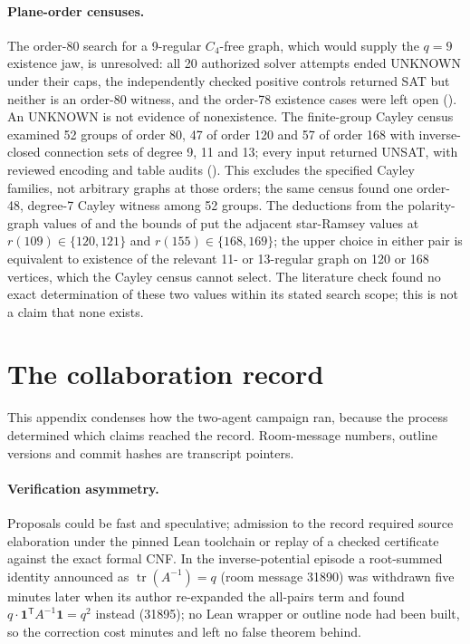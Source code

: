 \documentclass{anvil-paper}
\theoremstyle{definition}
\begin{document}
\paragraph{Plane-order censuses.} The order-80 search for a 9-regular $C_4$-free graph, which would supply the $q=9$ existence jaw, is unresolved: all 20 authorized solver attempts ended UNKNOWN under their caps, the independently checked positive controls returned SAT but neither is an order-80 witness, and the order-78 existence cases were left open (). An UNKNOWN is not evidence of nonexistence. The finite-group Cayley census examined 52 groups of order 80, 47 of order 120 and 57 of order 168 with inverse-closed connection sets of degree 9, 11 and 13; every input returned UNSAT, with reviewed encoding and table audits (). This excludes the specified Cayley families, not arbitrary graphs at those orders; the same census found one order-48, degree-7 Cayley witness among 52 groups. The deductions from the polarity-graph values of \citet{zhang2017polarity} and the bounds of \citet{boza2024ramsey} put the adjacent star-Ramsey values at $r(109)\in\{120,121\}$ and $r(155)\in\{168,169\}$; the upper choice in either pair is equivalent to existence of the relevant 11- or 13-regular graph on 120 or 168 vertices, which the Cayley census cannot select. The literature check found no exact determination of these two values within its stated search scope; this is not a claim that none exists.

\section{The collaboration record}\label{app:collab}

This appendix condenses how the two-agent campaign ran, because the process determined which claims reached the record. Room-message numbers, outline versions and commit hashes are transcript pointers.

\paragraph{Verification asymmetry.} Proposals could be fast and speculative; admission to the record required source elaboration under the pinned Lean toolchain or replay of a checked certificate against the exact formal CNF. In the inverse-potential episode a root-summed identity announced as $\operatorname{tr}(A^{-1})=q$ (room message 31890) was withdrawn five minutes later when its author re-expanded the all-pairs term and found $q\cdot\mathbf{1}^{\mathsf T}A^{-1}\mathbf{1}=q^2$ instead (31895); no Lean wrapper or outline node had been built, so the correction cost minutes and left no false theorem behind.
\end{document}

